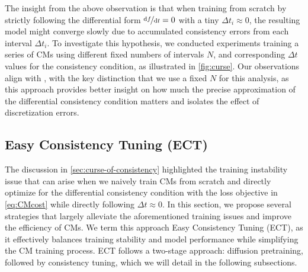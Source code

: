 \documentclass{article}
\begin{document}
The insight from the above observation is that when training from scratch by strictly following the differential form $\nicefrac{\mathrm{d}f}{\mathrm{d}t} = 0$ with a tiny $\Delta t_i \approx 0$, the resulting model might converge slowly due to accumulated consistency errors from each interval $\Delta t_i$. 
To investigate this hypothesis, we conducted experiments training a series of CMs using different fixed numbers of intervals $N$, and corresponding $\Delta t$ values for the consistency condition, as illustrated in \cref{fig:curse}. 
%
Our observations align with \citet{ict}, with the key distinction that we use a fixed $N$ for this analysis, as this approach provides better insight on how much the precise approximation of the differential consistency condition matters and isolates the effect of discretization errors.

\subsection{Easy Consistency Tuning (ECT)}
\label{sec:ect}
%
The discussion in \cref{sec:curse-of-consistency} highlighted the training instability issue that can arise when we naively train CMs from scratch and directly optimize for the differential consistency condition with the loss objective in \cref{eq:CMcost} while directly following $\Delta t \approx 0$.
%
In this section, we propose several strategies that largely alleviate the aforementioned training issues and improve the efficiency of CMs. We term this approach Easy Consistency Tuning (ECT), as it effectively balances training stability and model performance while simplifying the CM training process. ECT follows a two-stage approach: diffusion pretraining, followed by consistency tuning, which we will detail in the following subsections.
\end{document}
